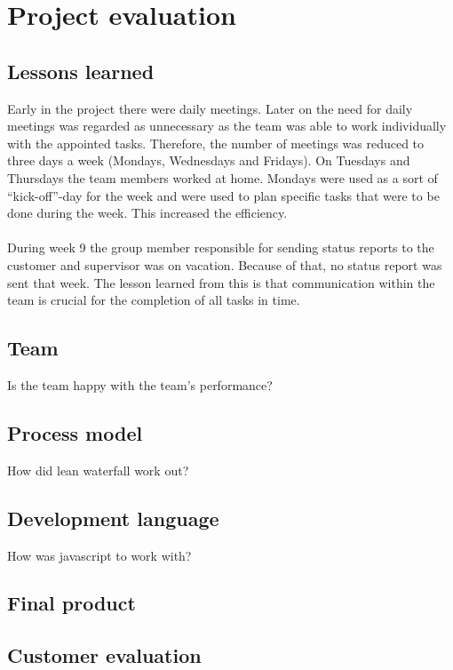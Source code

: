 \chapter{Project evaluation}

\section{Lessons learned}

Early in the project there were daily meetings. Later on the need for daily meetings was regarded as unnecessary as the team was able to work individually with the appointed tasks. Therefore, the number of meetings was reduced to three days a week (Mondays, Wednesdays and Fridays). On Tuesdays and Thursdays the team members worked at home. Mondays were used as a sort of “kick-off”-day for the week and were used to plan specific tasks that were to be done during the week. This increased the efficiency.\\
\\
During week 9 the group member responsible for sending status reports to the customer and supervisor was on vacation. Because of that, no status report was sent that week. The lesson learned from this is that communication within the team is crucial for the completion of all tasks in time.\\

\section{Team}

Is the team happy with the team's performance?

\section{Process model}

How did lean waterfall work out?

\section{Development language}

How was javascript to work with?

\section{Final product}

\section{Customer evaluation}

